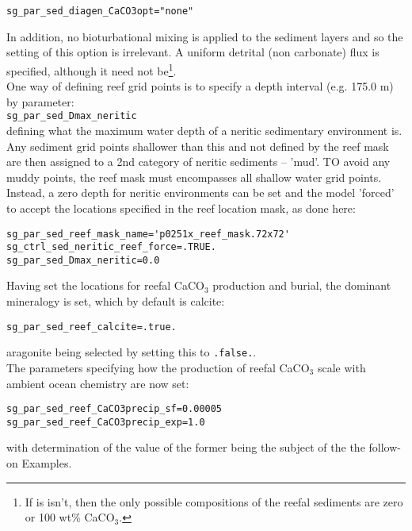 \documentclass[10pt,twoside]{article}
\begin{document}
\begin{compactitem}
\begin{verbatim}
sg_par_sed_diagen_CaCO3opt="none"
                \end{verbatim}\vspace{-5pt}
                In addition, no bioturbational mixing is applied to the sediment layers and so the setting of this option is irrelevant. A uniform detrital (non carbonate) flux is specified, although it need not be\footnote{If is isn't, then the only possible compositions of the reefal sediments are zero or 100 wt\% CaCO$_{3}$.}.
\\ One way of defining reef grid points is to specify a depth interval (e.g. 175.0 m) by parameter:
\\\texttt{sg\_par\_sed\_Dmax\_neritic}
\\defining what the maximum water depth of a neritic sedimentary environment is. Any sediment grid points shallower than this and not defined by the reef mask are then assigned to a 2nd category of neritic sediments -- 'mud'. TO avoid any muddy points, the reef mask must encompasses all shallow water grid points.
                Instead, a zero depth for neritic environments can be set and the model 'forced' to accept the locations specified in the reef location mask, as done here:
\vspace{-5pt}\begin{verbatim}
sg_par_sed_reef_mask_name='p0251x_reef_mask.72x72'
sg_ctrl_sed_neritic_reef_force=.TRUE.
sg_par_sed_Dmax_neritic=0.0
                \end{verbatim}\vspace{-5pt}
Having set the locations for reefal CaCO$_{3}$ production and burial, the dominant mineralogy is set, which by default is calcite:
\vspace{-5pt}\begin{verbatim}
sg_par_sed_reef_calcite=.true.
                \end{verbatim}\vspace{-5pt}
                aragonite being selected by setting this to \texttt{.false.}.
                \\ The parameters specifying how the production of reefal CaCO$_{3}$ scale with ambient ocean chemistry are now set:
\vspace{-5pt}\begin{verbatim}
sg_par_sed_reef_CaCO3precip_sf=0.00005
sg_par_sed_reef_CaCO3precip_exp=1.0
                \end{verbatim}\vspace{-5pt}
                with determination of the value of the former being the subject of the the follow-on Examples.

\end{compactitem}
\end{document}
